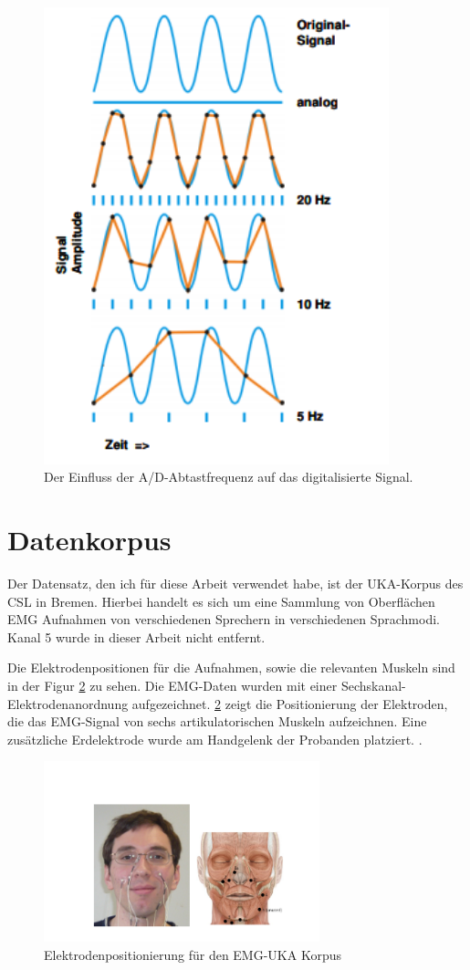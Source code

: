 \begin{figure}[H]
  \centering
  \includegraphics[width= 100mm]{DigEMG.png}
  \caption{ Der Einfluss der A/D-Abtastfrequenz auf das digitalisierte Signal.  \cite{KonEMG2001-ATO}}
  \label{fig:DEMG}
\end{figure}

\section{Datenkorpus}
Der Datensatz, den ich für diese Arbeit verwendet habe, ist der \cite{WaJaSch2014-IS} UKA-Korpus des CSL in Bremen. Hierbei handelt es sich um eine Sammlung von Oberflächen EMG Aufnahmen von verschiedenen Sprechern in verschiedenen Sprachmodi. Kanal 5 wurde in dieser Arbeit nicht entfernt. 


Die Elektrodenpositionen für die Aufnahmen, sowie die relevanten Muskeln sind in der Figur  \ref{fig:uka1} zu sehen. 
Die EMG-Daten wurden mit einer Sechskanal-Elektrodenanordnung aufgezeichnet. \ref{fig:uka1} zeigt die Positionierung der Elektroden, die das EMG-Signal von sechs artikulatorischen Muskeln aufzeichnen. Eine zusätzliche Erdelektrode wurde am Handgelenk der Probanden platziert. \cite{WaJaSch2014-IS}. 

\begin{figure}[H]
  \centering
  \includegraphics[width=80mm]{UKARecording.png}
  \caption{Elektrodenpositionierung für den EMG-UKA Korpus  \cite{WaJaSch2014-IS}}
  \label{fig:uka1}
\end{figure}

